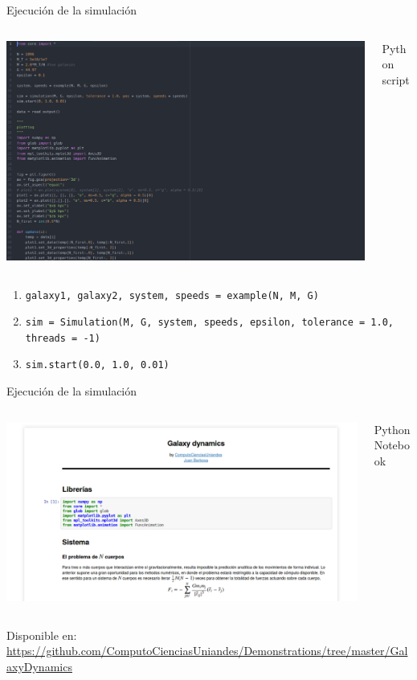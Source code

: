 \documentclass[handout]{beamer}
\begin{document}
\begin{frame}{Ejecuci\'on de la simulaci\'on}
	\begin{columns}
		\begin{column}{0.75\textwidth}
			\includegraphics[height=0.5\textheight]{sources/images/code.png}
		\end{column}
		\begin{column}{0.25\textwidth}
			Python script
		\end{column}
	\end{columns}
	\footnotesize
	\begin{enumerate}
		\item \texttt{galaxy1, galaxy2, system, speeds = example(N, M, G)} \pause
		\item \texttt{sim = Simulation(M, G, system, speeds, epsilon, tolerance = 1.0, threads = -1)} \pause
		\item \texttt{sim.start(0.0, 1.0, 0.01)}
	\end{enumerate}
\end{frame}
\begin{frame}{Ejecuci\'on de la simulaci\'on}
	\begin{columns}
		\begin{column}{0.75\textwidth}
			\includegraphics[height=0.5\textheight]{sources/images/screen.png}
		\end{column}
		\begin{column}{0.25\textwidth}
			Python Notebook
		\end{column}
	\end{columns}
	Disponible en:
	\tiny
	\url{https://github.com/ComputoCienciasUniandes/Demonstrations/tree/master/GalaxyDynamics}
	\normalsize
\end{frame}
\end{document}
